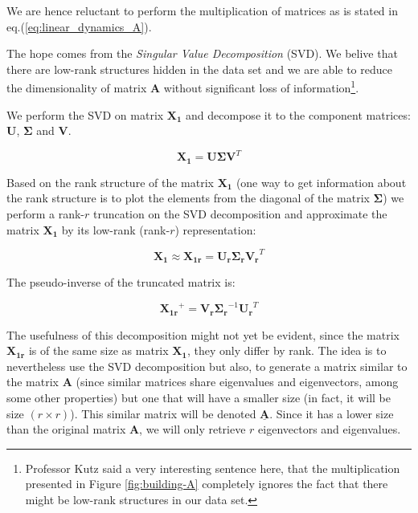 \documentclass[10pt,twocolumn]{article}
\begin{document}
We are hence reluctant to perform the multiplication of matrices as is stated in eq.(\ref{eq:linear_dynamics_A}). 

The hope comes from the \textit{Singular Value Decomposition} (SVD). We belive that there are low-rank structures hidden in the data set and we are able to reduce the dimensionality of matrix $\mathbf{A}$ without significant loss of information\footnote{Professor Kutz said a very interesting sentence here, that the multiplication presented in Figure \ref{fig:building-A} completely ignores the fact that there might be low-rank structures in our data set.}.

We perform the SVD on matrix $\mathbf{X_1}$ and decompose it to the component matrices: $\mathbf{U}$, $\mathbf{\Sigma}$ and $\mathbf{V}$.

\begin{equation} \label{eq:solution}
\mathbf{X_1} = \mathbf{U} \mathbf{\Sigma} \mathbf{V}^T 
\end{equation}

Based on the rank structure of the matrix $\mathbf{X_1}$ (one way to get information about the rank structure is to plot the elements from the diagonal of the matrix $\mathbf{\Sigma}$) we perform a rank-$r$ truncation on the SVD decomposition and approximate the matrix $\mathbf{X_1}$ by its low-rank (rank-$r$) representation:

\begin{equation} \label{eq:solution-approx}
\mathbf{X_1} \approx \mathbf{X_{1r}} = \mathbf{U_r} \mathbf{\Sigma_r} \mathbf{V_r}^T 
\end{equation}

The pseudo-inverse of the truncated matrix is:

\begin{equation} \label{eq:pseudo-inverse}
\mathbf{X_{1r}}^{+} = \mathbf{V_r}  \mathbf{\Sigma_r}^{-1} \mathbf{U_r}^T
\end{equation}

The usefulness of this decomposition might not yet be evident, since the matrix $\mathbf{X_{1r}}$ is of the same size as matrix $\mathbf{X_{1}}$, they only differ by rank. The idea is to nevertheless use the SVD decomposition but also, to generate a matrix similar to the matrix $\mathbf{A}$ (since similar matrices share eigenvalues and eigenvectors, among some other properties) but one that will have a smaller size (in fact, it will be size $(r \times r)$). This similar matrix will be denoted $\underline{\mathbf{A}}$. Since it has a lower size than the original matrix $\mathbf{A}$, we will only retrieve $r$ eigenvectors and eigenvalues.
\end{document}
